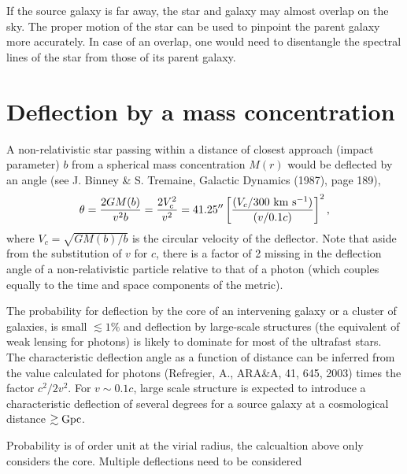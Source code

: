 \documentclass[11pt,preprint]{aastex}
\begin{document}
If the source galaxy is far away, the star and galaxy may almost
overlap on the sky. The proper motion of the star can be used to
pinpoint the parent galaxy more accurately. In case of an overlap, one
would need to disentangle the spectral lines of the star from those of
its parent galaxy.

\section{Deflection by a mass concentration}

A non-relativistic star passing within a distance of closest approach
(impact parameter) $b$ from a spherical mass concentration $M(r)$
would be deflected by an angle (see J. Binney \& S. Tremaine, Galactic
Dynamics (1987), page 189),
\begin{equation}
\theta={2GM(b)\over v^2 b}={2V_c^2\over
v^2}=41.25^{\prime\prime}\left[{(V_c/300~{\rm km~s^{-1}})\over
(v/0.1c)}\right]^2 ,
\label{eq:3}
\end{equation}
where $V_c=\sqrt{GM(b)/b}$ is the circular velocity of the deflector.
Note that aside from the substitution of $v$ for $c$, there is a
factor of 2 missing in the deflection angle of a non-relativistic
particle relative to that of a photon (which couples equally to the
time and space components of the metric).

The probability for deflection by the core of an intervening galaxy or
a cluster of galaxies, is small $\lesssim 1\%$ and deflection by
large-scale structures (the equivalent of weak lensing for photons) is
likely to dominate for most of the ultrafast stars. The characteristic
deflection angle as a function of distance can be inferred from the
value calculated for photons (Refregier, A., ARA\&A, 41, 645, 2003)
times the factor $c^2/2v^2$. For $v\sim 0.1c$, large scale structure
is expected to introduce a characteristic deflection of several
degrees for a source galaxy at a cosmological distance $\gtrsim {\rm
Gpc}$.

Probability is of order unit at the virial radius, the calcualtion above only considers the core. Multiple deflections need to be considered
\end{document}
